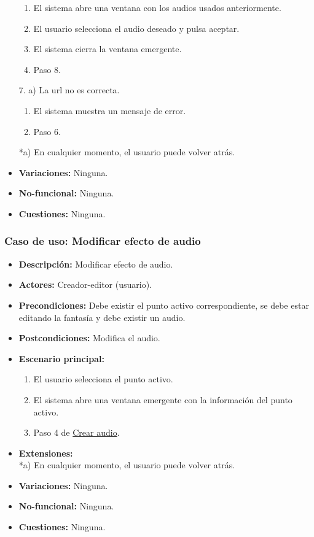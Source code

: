 \begin{itemize}
	\begin{enumerate}
		\item El sistema abre una ventana con los audios usados anteriormente.
		\item El usuario selecciona el audio deseado y pulsa aceptar.
		\item El sistema cierra la ventana emergente.
		\item Paso 8.
	\end{enumerate}
	7. a) La url no es correcta.
	\begin{enumerate}
		\item El sistema muestra un mensaje de error.
		\item Paso 6.
	\end{enumerate}
	*a) En cualquier momento, el usuario puede volver atrás.
	\item \textbf{Variaciones:} Ninguna.
	\item \textbf{No-funcional:} Ninguna.
	\item \textbf{Cuestiones:} Ninguna.
\end{itemize}

\subsubsection{Caso de uso: Modificar efecto de audio}
\begin{itemize}
	\item \textbf{Descripción:} Modificar efecto de audio.
	\item \textbf{Actores:} Creador-editor (usuario).
	\item \textbf{Precondiciones:} Debe existir el punto activo correspondiente, se debe estar editando la fantasía y debe existir un audio.
	\item \textbf{Postcondiciones:} Modifica el audio.
	\item \textbf{Escenario principal:}
	\begin{enumerate}
		\item El usuario selecciona el punto activo.
		\item El sistema abre una ventana emergente con la información del punto activo.
		\item Paso 4 de \hyperlink{crearaudio}{Crear audio}.
	\end{enumerate}
	\item \textbf{Extensiones:} \\ *a) En cualquier momento, el usuario puede volver atrás.
	\item \textbf{Variaciones:} Ninguna.
	\item \textbf{No-funcional:} Ninguna.
	\item \textbf{Cuestiones:} Ninguna.
\end{itemize}

